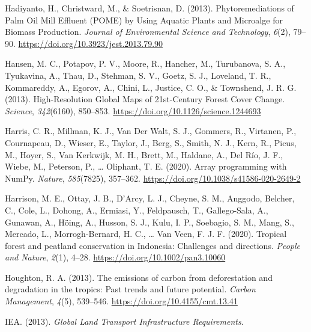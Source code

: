 \documentclass[
  letterpaper,
  DIV=11,
  numbers=noendperiod]{scrreprt}
\newlength{\cslhangindent}
\newlength{\cslentryspacingunit} %
\newenvironment{CSLReferences}[2] %
 {%
  \setlength{\parindent}{0pt}
  \ifodd #1
  \let\oldpar\par
  \def\par{\hangindent=\cslhangindent\oldpar}
  \fi
  \setlength{\parskip}{#2\cslentryspacingunit}
 }%
 {}
\begin{document}
\begin{CSLReferences}{1}{0}
\leavevmode{}%
Hadiyanto, H., Christward, M., \& Soetrisnan, D. (2013).
Phytoremediations of {Palm Oil Mill Effluent} ({POME}) by {Using Aquatic
Plants} and {Microalge} for {Biomass Production}. \emph{Journal of
Environmental Science and Technology}, \emph{6}(2), 79--90.
\url{https://doi.org/10.3923/jest.2013.79.90}

\leavevmode{}%
Hansen, M. C., Potapov, P. V., Moore, R., Hancher, M., Turubanova, S.
A., Tyukavina, A., Thau, D., Stehman, S. V., Goetz, S. J., Loveland, T.
R., Kommareddy, A., Egorov, A., Chini, L., Justice, C. O., \& Townshend,
J. R. G. (2013). High-{Resolution Global Maps} of 21st-{Century Forest
Cover Change}. \emph{Science}, \emph{342}(6160), 850--853.
\url{https://doi.org/10.1126/science.1244693}

\leavevmode{}%
Harris, C. R., Millman, K. J., Van Der Walt, S. J., Gommers, R.,
Virtanen, P., Cournapeau, D., Wieser, E., Taylor, J., Berg, S., Smith,
N. J., Kern, R., Picus, M., Hoyer, S., Van Kerkwijk, M. H., Brett, M.,
Haldane, A., Del Río, J. F., Wiebe, M., Peterson, P., \ldots{} Oliphant,
T. E. (2020). Array programming with {NumPy}. \emph{Nature},
\emph{585}(7825), 357--362.
\url{https://doi.org/10.1038/s41586-020-2649-2}

\leavevmode{}%
Harrison, M. E., Ottay, J. B., D'Arcy, L. J., Cheyne, S. M., Anggodo,
Belcher, C., Cole, L., Dohong, A., Ermiasi, Y., Feldpausch, T.,
Gallego-Sala, A., Gunawan, A., Höing, A., Husson, S. J., Kulu, I. P.,
Soebagio, S. M., Mang, S., Mercado, L., Morrogh-Bernard, H. C., \ldots{}
Van Veen, F. J. F. (2020). Tropical forest and peatland conservation in
{Indonesia}: {Challenges} and directions. \emph{People and Nature},
\emph{2}(1), 4--28. \url{https://doi.org/10.1002/pan3.10060}

\leavevmode{}%
Houghton, R. A. (2013). The emissions of carbon from deforestation and
degradation in the tropics: Past trends and future potential.
\emph{Carbon Management}, \emph{4}(5), 539--546.
\url{https://doi.org/10.4155/cmt.13.41}

\leavevmode{}%
IEA. (2013). \emph{Global {Land Transport Infrastructure Requirements}}.


\end{CSLReferences}
\end{document}
